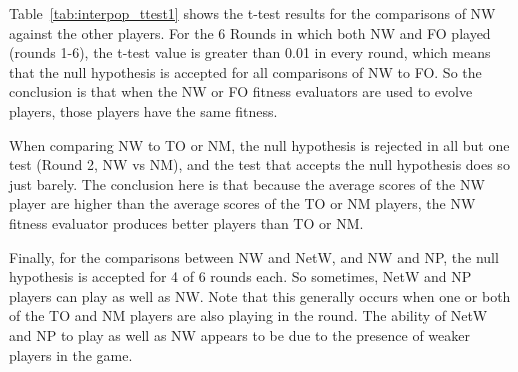 Table~\ref{tab:interpop_ttest1} shows the t-test results for the comparisons of
NW against the other players. For the 6 Rounds in which both NW and FO played
(rounds 1-6), the t-test value is greater than 0.01 in every round, which means
that the null hypothesis is accepted for all comparisons of NW to FO. So the
conclusion is that when the NW or FO fitness evaluators are used to evolve
players, those players have the same fitness.

When comparing NW to TO or NM, the null hypothesis is rejected in all but one
test (Round 2, NW vs NM), and the test that accepts the null hypothesis does so
just barely. The conclusion here is that because the average scores of the NW
player are higher than the average scores of the TO or NM players, the NW
fitness evaluator produces better players than TO or NM.

Finally, for the comparisons between NW and NetW, and NW and NP, the null
hypothesis is accepted for 4 of 6 rounds each. So sometimes, NetW and NP players
can play as well as NW. Note that this generally occurs when one or both of the
TO and NM players are also playing in the round. The ability of NetW and NP to
play as well as NW appears to be due to the presence of weaker players in the
game.

